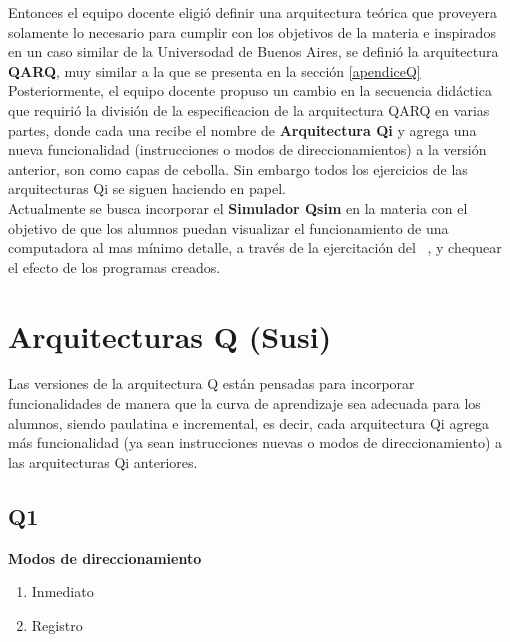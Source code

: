 Entonces el equipo docente eligió definir una arquitectura teórica que proveyera solamente lo necesario para cumplir con los objetivos de la materia e inspirados en un caso similar de la Universodad de Buenos Aires, se definió la arquitectura \textbf{QARQ}, muy similar a la que se presenta en la sección \ref{apendiceQ}\\


Posteriormente, el equipo docente propuso un cambio en la secuencia didáctica que requirió la división de la especificacion de la arquitectura QARQ en varias partes, donde cada una recibe el nombre de \textbf{Arquitectura Qi} y agrega una nueva funcionalidad (instrucciones o modos de direccionamientos) a la versión anterior, son como capas de cebolla. Sin embargo todos los ejercicios de las arquitecturas Qi se siguen haciendo en papel. \\

Actualmente se busca incorporar el \textbf{Simulador Qsim} en la materia con el objetivo de que los alumnos puedan visualizar el funcionamiento de una computadora al mas mínimo detalle, a través de la ejercitación del \ciclo\ , y chequear el efecto de los programas creados.

\section{Arquitecturas Q (Susi)}

Las versiones de la arquitectura Q están pensadas para incorporar funcionalidades de manera que la curva de aprendizaje sea adecuada para los alumnos, siendo paulatina e incremental, es decir, cada arquitectura Qi agrega más funcionalidad (ya sean instrucciones nuevas o modos de direccionamiento) a las arquitecturas Qi anteriores.


\subsection{Q1}


\textbf{Modos de direccionamiento}
\begin{enumerate}
\item Inmediato
\item Registro
\end{enumerate}

